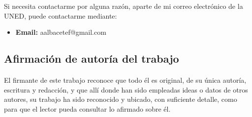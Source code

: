 Si necesita contactarme por alguna razón, aparte de mi correo electrónico de la UNED, puede contactarme mediante:
\begin{itemize}
	\item \textbf{Email:} aalbacetef@gmail.com
\end{itemize}

\subsection{Afirmación de autoría del trabajo}

\paragraph{}

El firmante de este trabajo reconoce que todo él es original, de su única autoría, escritura
y redacción, y que allí donde han sido empleadas ideas o datos de otros autores, su
trabajo ha sido reconocido y ubicado, con suficiente detalle, como para que el lector
pueda consultar lo afirmado sobre él.
